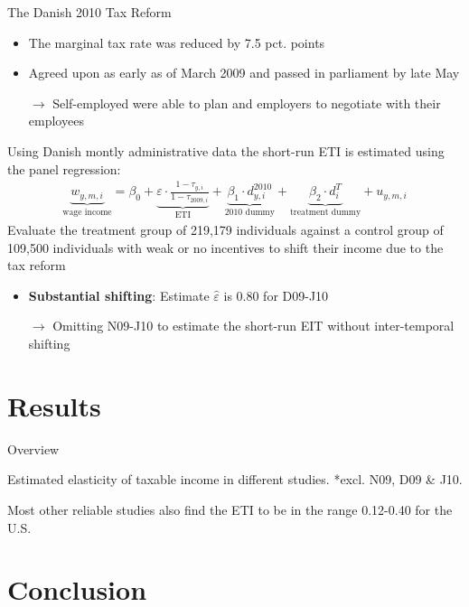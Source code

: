 \documentclass[8pt]{beamer}
\begin{document}
\begin{frame}{\citet{kreiner2016tax}}
  The Danish 2010 Tax Reform
  \begin{itemize}
    \item The marginal tax rate was reduced by 7.5 pct. points
    \item Agreed upon as early as  of March 2009 and passed in parliament by late May
    \item[$\rightarrow$] Self-employed were able to plan and employers to negotiate with their employees
  \end{itemize}
  Using Danish montly administrative data the short-run ETI is estimated using the panel regression: \begin{align}
    \underbrace{w_{y,m,i}}_\text{wage income} = \beta_0 + \underbrace{\varepsilon\cdot\frac{1-\tau_{y,i}}{1-\tau_{2009,i}}}_\text{ETI} + \underbrace{\beta_1\cdot d_{y,i}^{2010}}_\text{2010 dummy} + \underbrace{\beta_2\cdot d_i^T}_\text{treatment dummy} + u_{y,m,i}
    \label{eq:wage}
  \end{align}
  Evaluate the treatment group of 219,179 individuals against a control group of 109,500 individuals with weak or no incentives to shift their income due to the tax reform
  \begin{itemize}
    \item \textbf{Substantial shifting}: Estimate $\hat{\varepsilon}$ is 0.80 for D09-J10
    \item[$\rightarrow$] Omitting N09-J10 to estimate the short-run EIT without inter-temporal shifting
  \end{itemize}
\end{frame}


\section{Results}


\begin{frame}{Overview}
  \begin{table}
    \centering
    \footnotesize
    
    \caption{Estimated elasticity of taxable income in different studies. *excl. N09, D09 \& J10.}
    \label{tab:elasticities}
  \end{table}
  Most other reliable studies also find the ETI to be in the range 0.12-0.40 for the U.S. \citep{saez2012elasticity}
\end{frame}


\section{Conclusion}
\end{document}
